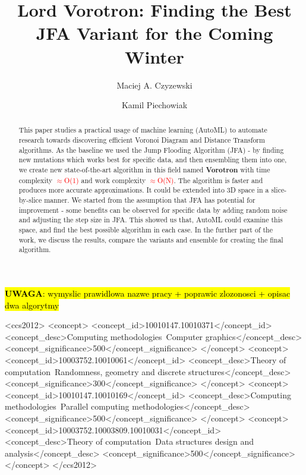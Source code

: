 \documentclass[format=acmsmall,screen,review,authordraft,nonacm]{acmart}
\title{Lord Vorotron: Finding the Best JFA Variant for the Coming Winter} %
\author{Maciej A. Czyzewski}
\affiliation{%
 \institution{Poznan University of Technology}
 \city{Poznan}
 \country{Poland}}
\author{Kamil Piechowiak}
\affiliation{%
 \institution{Poznan University of Technology}
 \city{Poznan}
 \country{Poland}}
\newcommand{\ourjfa}{Vorotron} %
\begin{document}


\hl{\textbf{UWAGA}: wymyslic prawidlowa nazwe pracy + poprawic zlozonosci +
opisac dwa algorytmy}

\begin{abstract}
This paper studies a practical usage of machine learning (AutoML) to automate
research towards discovering efficient Voronoi Diagram and Distance Transform
algorithms.  As the baseline we used the Jump Flooding Algorithm (JFA) - by
finding new mutations which works best for specific data, and then ensembling
them into one, we create new state-of-the-art algorithm in this field named
\textbf{\ourjfa} \hspace{0.01cm} with time complexity \textcolor{red}{$\approx$O(1)} and
work complexity \textcolor{red}{$\approx$O(N)}.
The algorithm is faster and produces more accurate approximations. It could be
extended into 3D space in a slice-by-slice manner.  We started from the
assumption that JFA has potential for improvement - some benefits can be
observed for specific data by adding random noise and adjusting the step size in
JFA.  This showed us that, AutoML could examine this space, and find the best
possible algorithm in each case.  In the further part of the work, we discuss
the results, compare the variants and ensemble for creating the final algorithm.
\end{abstract}


\begin{CCSXML}
<ccs2012>
<concept>
<concept_id>10010147.10010371</concept_id>
<concept_desc>Computing methodologies~Computer graphics</concept_desc>
<concept_significance>500</concept_significance>
</concept>
<concept>
<concept_id>10003752.10010061</concept_id>
<concept_desc>Theory of computation~Randomness, geometry and discrete structures</concept_desc>
<concept_significance>300</concept_significance>
</concept>
<concept>
<concept_id>10010147.10010169</concept_id>
<concept_desc>Computing methodologies~Parallel computing methodologies</concept_desc>
<concept_significance>500</concept_significance>
</concept>
<concept>
<concept_id>10003752.10003809.10010031</concept_id>
<concept_desc>Theory of computation~Data structures design and analysis</concept_desc>
<concept_significance>500</concept_significance>
</concept>
</ccs2012>
\end{CCSXML}
\end{document}
